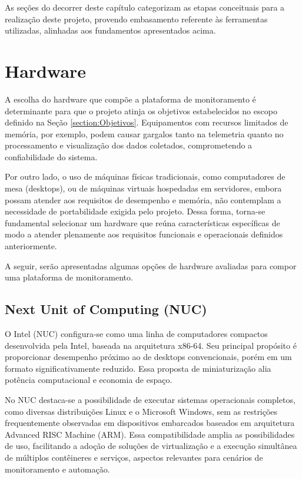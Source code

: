 As seções do decorrer deste capítulo categorizam as etapas conceituais para a realização deste projeto, provendo embasamento referente às ferramentas utilizadas, alinhadas aos fundamentos apresentados acima.


\section{Hardware}
\label{section:Hardware}

A escolha do hardware que compõe a plataforma de monitoramento é determinante para que o projeto atinja os objetivos estabelecidos no escopo definido na Seção \ref{section:Objetivos}. Equipamentos com recursos limitados de memória, por exemplo, podem causar gargalos tanto na telemetria quanto no processamento e visualização dos dados coletados, comprometendo a confiabilidade do sistema.

Por outro lado, o uso de máquinas físicas tradicionais, como computadores de mesa (desktops), ou de máquinas virtuais hospedadas em servidores, embora possam atender aos requisitos de desempenho e memória, não contemplam a necessidade de portabilidade exigida pelo projeto. Dessa forma, torna-se fundamental selecionar um hardware que reúna características específicas de modo a atender plenamente aos requisitos funcionais e operacionais definidos anteriormente.

A seguir, serão apresentadas algumas opções de hardware avaliadas para compor uma plataforma de monitoramento.

\subsection{Next Unit of Computing (NUC)}
\label{subsection:NUC}

O Intel  (NUC) \citep{nuc2025} configura-se como uma linha de computadores compactos desenvolvida pela Intel, baseada na arquitetura x86-64. Seu principal propósito é proporcionar desempenho próximo ao de desktops convencionais, porém em um formato significativamente reduzido. Essa proposta de miniaturização alia potência computacional e economia de espaço.

No NUC destaca-se a possibilidade de executar sistemas operacionais completos, como diversas distribuições Linux e o Microsoft Windows, sem as restrições frequentemente observadas em dispositivos embarcados baseados em arquitetura Advanced RISC Machine (ARM). Essa compatibilidade amplia as possibilidades de uso, facilitando a adoção de soluções de virtualização e a execução simultânea de múltiplos contêineres e serviços, aspectos relevantes para cenários de monitoramento e automação.

